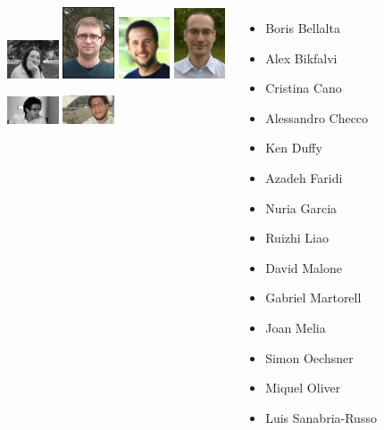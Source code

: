 \documentclass{beamer}
\begin{document}
\begin{frame}
\begin{columns}[t]
\begin{center}
        \includegraphics[width=0.6in]{figures/david}
        \includegraphics[width=0.6in]{figures/gabriel}
        \includegraphics[width=0.6in]{figures/joan}
        \includegraphics[width=0.6in]{figures/simon}

        \includegraphics[width=0.6in]{figures/miquel}
        \includegraphics[width=0.6in]{figures/luis}
      \end{center}
        \begin{itemize}
          \item Boris Bellalta
          \item Alex Bikfalvi
          \item Cristina Cano
          \item Alessandro Checco
          \item Ken Duffy
          \item Azadeh Faridi
          \item Nuria Garcia
          \item Ruizhi Liao
          \item David Malone
          \item Gabriel Martorell
          \item Joan Melia
          \item Simon Oechsner
          \item Miquel Oliver
          \item Luis Sanabria-Russo
        \end{itemize}
  \end{columns}
\end{frame}
\end{document}
